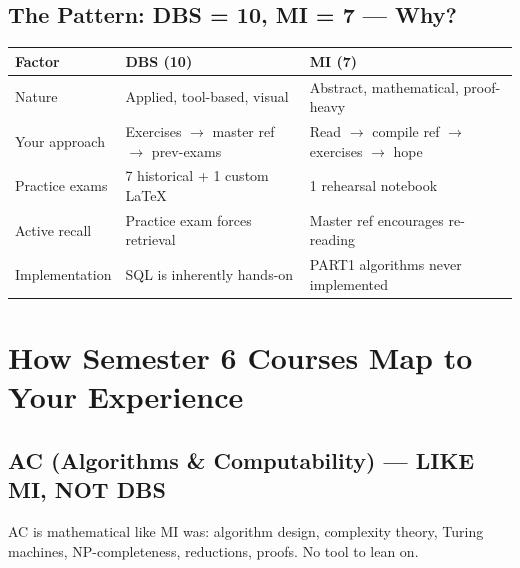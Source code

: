 \documentclass[11pt,a4paper]{article}
\begin{document}
\subsection{The Pattern: DBS = 10, MI = 7 --- Why?}

\begin{center}
\renewcommand{\arraystretch}{1.3}
\begin{tabular}{lll}
\toprule
\textbf{Factor} & \textbf{DBS (10)} & \textbf{MI (7)} \\
\midrule
Nature & Applied, tool-based, visual & Abstract, mathematical, proof-heavy \\
Your approach & Exercises $\rightarrow$ master ref $\rightarrow$ prev-exams & Read $\rightarrow$ compile ref $\rightarrow$ exercises $\rightarrow$ hope \\
Practice exams & 7 historical + 1 custom LaTeX & 1 rehearsal notebook \\
Active recall & Practice exam forces retrieval & Master ref encourages re-reading \\
Implementation & SQL is inherently hands-on & PART1 algorithms never implemented \\
\bottomrule
\end{tabular}
\end{center}

\vspace{0.3em}

\section{How Semester 6 Courses Map to Your Experience}

\subsection{\textcolor{accolor}{AC (Algorithms \& Computability)} --- LIKE MI, NOT DBS}

AC is mathematical like MI was: algorithm design, complexity theory, Turing machines, NP-completeness, reductions, proofs. No tool to lean on.
\end{document}
